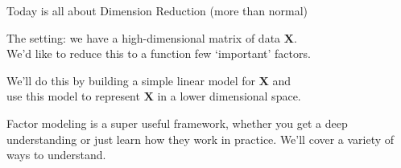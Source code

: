 \documentclass[11pt,xcolor=svgnames]{beamer}
\newcommand{\theme}{\color{Maroon}}
\newcommand{\bk}{\color{black}}
\newcommand{\gr}{\color{black!60}}
\newcommand{\sg}{\color{DarkSlateGray}}
\newcommand{\nv}{\color{Navy}}
\newcommand{\bm}[1]{\mathbf{#1}}
\newcommand{\sk}{\vspace{.5cm}}
\begin{document}
\setcounter{page}{0}
{ 
 }


\begin{frame}


{Today is all about \theme  Dimension Reduction} \gr (more than
normal) 

\sk\bk
{\nv The setting:}  we have a high-dimensional matrix of data $\bm{X}$.\\

We'd like to reduce this to a function few  `important' factors.


\sk
We'll do this by building a simple linear model for $\bm{X}$ 
and \\use this model to represent $\bm{X}$ in a  lower dimensional
space.

\sk\sg
Factor modeling is a super useful framework,
whether you get a deep understanding or just learn how they work in practice.
\gr We'll cover a variety of ways to understand.

\end{frame}
\end{document}
